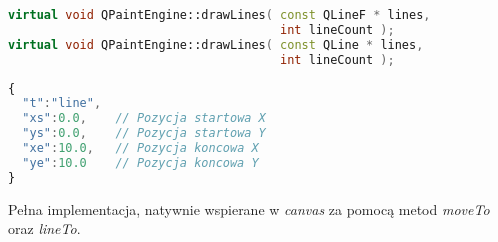 \begin{lstlisting}[language=C++,numbers=none]
virtual void QPaintEngine::drawLines( const QLineF * lines, 
                                      int lineCount );
virtual void QPaintEngine::drawLines( const QLine * lines, 
                                      int lineCount );
\end{lstlisting}
\begin{lstlisting}[language=JavaScript,numbers=none]
{
  "t":"line",
  "xs":0.0,    // Pozycja startowa X
  "ys":0.0,    // Pozycja startowa Y
  "xe":10.0,   // Pozycja koncowa X
  "ye":10.0    // Pozycja koncowa Y
}
\end{lstlisting}

Pełna implementacja, natywnie wspierane w \emph{canvas} za pomocą metod \emph{moveTo} oraz \emph{lineTo}.